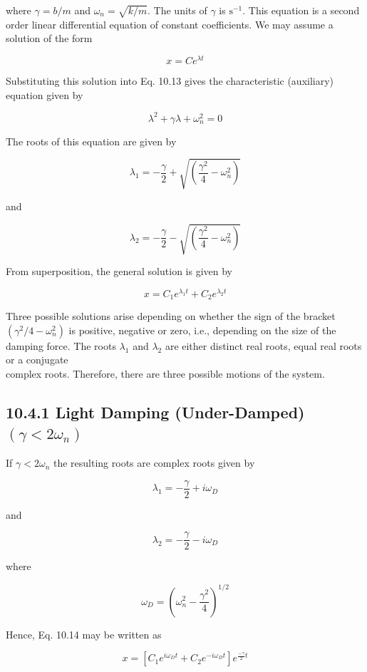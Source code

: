 \documentclass[10pt]{article}
\begin{document}
where $\gamma=b / m$ and $\omega_{n}=\sqrt{k / m}$. The units of $\gamma$ is $\mathrm{s}^{-1}$. This equation is a second order linear differential equation of constant coefficients. We may assume a solution of the form

$$
x=C e^{\lambda t}
$$

Substituting this solution into Eq. 10.13 gives the characteristic (auxiliary) equation given by

$$
\lambda^{2}+\gamma \lambda+\omega_{n}^{2}=0
$$

The roots of this equation are given by

$$
\lambda_{1}=-\frac{\gamma}{2}+\sqrt{\left(\frac{\gamma^{2}}{4}-\omega_{n}^{2}\right)}
$$

and

$$
\lambda_{2}=-\frac{\gamma}{2}-\sqrt{\left(\frac{\gamma^{2}}{4}-\omega_{n}^{2}\right)}
$$

From superposition, the general solution is given by


\begin{equation*}
x=C_{1} e^{\lambda_{1} t}+C_{2} e^{\lambda_{2} t} \tag{10.14}
\end{equation*}


Three possible solutions arise depending on whether the sign of the bracket $\left(\gamma^{2} / 4-\omega_{n}^{2}\right)$ is positive, negative or zero, i.e., depending on the size of the damping force. The roots $\lambda_{1}$ and $\lambda_{2}$ are either distinct real roots, equal real roots or a conjugate\\
complex roots. Therefore, there are three possible motions of the system.

\subsection*{10.4.1 Light Damping (Under-Damped) $\left(\gamma<2 \omega_{n}\right)$}
If $\gamma<2 \omega_{n}$ the resulting roots are complex roots given by

$$
\lambda_{1}=-\frac{\gamma}{2}+i \omega_{D}
$$

and

$$
\lambda_{2}=-\frac{\gamma}{2}-i \omega_{D}
$$

where

$$
\omega_{D}=\left(\omega_{n}^{2}-\frac{\gamma^{2}}{4}\right)^{1 / 2}
$$

Hence, Eq. 10.14 may be written as

$$
x=\left[C_{1} e^{i \omega_{D} t}+C_{2} e^{-i \omega_{D} t}\right] e^{\frac{-\gamma}{2} t}
$$
\end{document}
